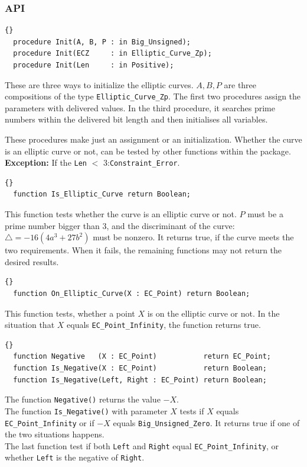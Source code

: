 \subsubsection*{API}
\begin{lstlisting}{}
  procedure Init(A, B, P : in Big_Unsigned);
  procedure Init(ECZ     : in Elliptic_Curve_Zp);
  procedure Init(Len     : in Positive);
\end{lstlisting}
These are three ways to initialize the elliptic curves.  $A,B,P$ are
three compositions of the type \texttt{Elliptic\_Curve\_Zp}. The first
two procedures assign the parameters with delivered values. In the
third procedure, it searches prime numbers within the delivered bit
length and then initialises all variables.

These procedures make just an assignment or an initialization. Whether
the curve is an elliptic curve or not, can be tested by other
functions within the package.\\ 

\noindent\textbf{Exception:} If the
\texttt{Len} $<$ 3:\quad\texttt{Constraint\_Error}.

\hhline
\begin{lstlisting}{}
  function Is_Elliptic_Curve return Boolean;
\end{lstlisting}
This function tests whether the curve is an elliptic curve or not.
$P$ must be a prime number bigger than 3, and the discriminant of the
curve: $\bigtriangleup = -16(4a^3+27b^2)$ must be nonzero. It returns
true, if the curve meets the two requirements. When it fails, the
remaining functions may not return the desired results.

\hhline

\begin{lstlisting}{}
  function On_Elliptic_Curve(X : EC_Point) return Boolean;
\end{lstlisting}
This function tests, whether a point $X$ is on the elliptic curve or
not. In the situation that $X$ equals \texttt{EC\_Point\_Infinity},
the function returns true.

\hhline

\begin{lstlisting}{}
  function Negative   (X : EC_Point)           return EC_Point;
  function Is_Negative(X : EC_Point)           return Boolean;
  function Is_Negative(Left, Right : EC_Point) return Boolean;
\end{lstlisting}
The function \texttt{Negative()} returns the value $-X$.\\ The
function \texttt{Is\_Negative()} with parameter $X$ tests if $X$
equals \texttt{EC\_Point\_Infinity} or if $-X$ equals
\texttt{Big\_Unsigned\_Zero}. It returns true if one of the two
situations happens.\\ The last function test if both \texttt{Left} and
\texttt{Right} equal \texttt{EC\_Point\_Infinity}, or whether
\texttt{Left} is the negative of \texttt{Right}.

